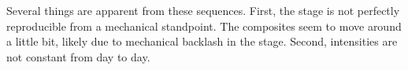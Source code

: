 Several things are apparent from these sequences. First, the stage is not
perfectly reproducible from a mechanical standpoint. The composites seem to move
around a little bit, likely due to mechanical backlash in the stage. Second,
intensities are not constant from day to day.